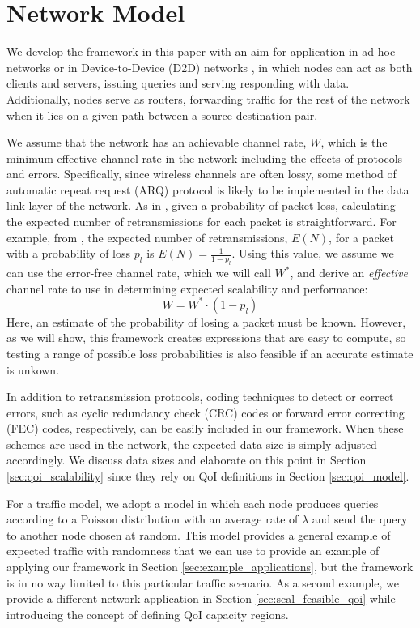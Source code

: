 \section{Network Model}
\label{sec:network_model}

We develop the framework in this paper with an aim for application in ad hoc networks {\color{blue}or in Device-to-Device (D2D) networks \cite{d2d_survey}}, in which nodes can act as both clients and servers, issuing queries and serving responding with data. Additionally, nodes serve as routers, forwarding traffic for the rest of the network when it lies on a given path between a source-destination pair.  

{\color{blue}We assume that the network has an achievable channel rate, $W$, which is the minimum effective channel rate in the network including the effects of protocols and errors. Specifically, since wireless channels are often lossy, some method of automatic repeat request (ARQ) protocol is likely to be implemented in the data link layer of the network. As in \cite{arq_schemes}, given a probability of packet loss, calculating the expected number of retransmissions for each packet is straightforward. For example, from \cite{arq_schemes}, the expected number of retransmissions, $E(N)$, for a packet with a probability of loss $p_l$ is $E(N) = \frac{1}{1-p_l}$. Using this value, we assume we can use the error-free channel rate, which we will call $W^*$, and derive an \emph{effective} channel rate to use in determining expected scalability and performance:
\begin{equation}
  W = W^* \cdot (1 - p_l)
\end{equation}
Here, an estimate of the probability of losing a packet must be known. However, as we will show, this framework creates expressions that are easy to compute, so testing a range of possible loss probabilities is also feasible if an accurate estimate is unkown.

In addition to retransmission protocols, coding techniques to detect or correct errors, such as cyclic redundancy check (CRC) codes or forward error correcting (FEC) codes, respectively, can be easily included in our framework. When these schemes are used in the network, the expected data size is simply adjusted accordingly. We discuss data sizes and elaborate on this point in Section \ref{sec:qoi_scalability} since they rely on QoI definitions in Section \ref{sec:qoi_model}.}

For a traffic model, we adopt a model in which each node produces queries according to a Poisson distribution with an average rate of $\lambda$ and send the query to another node chosen at random.  This model provides a general example of expected traffic with randomness that we can use to provide an example of applying our framework in Section \ref{sec:example_applications}, but the framework is in no way limited to this particular traffic scenario.  As a second example, we provide a different network application in Section \ref{sec:scal_feasible_qoi} while introducing the concept of defining QoI capacity regions.  

